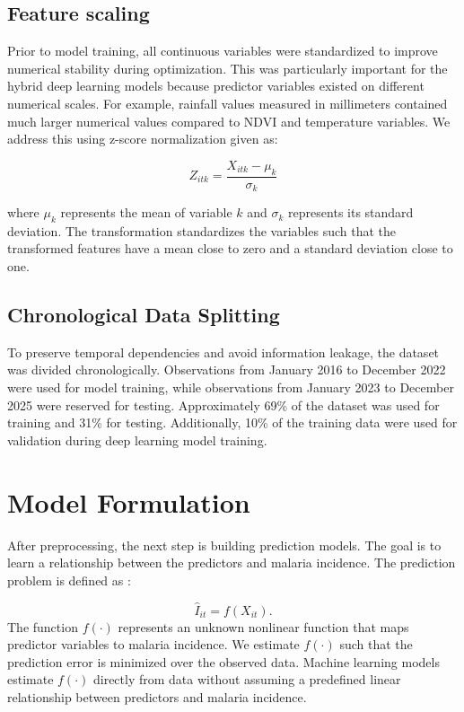     \subsection{Feature scaling}
    \label{sec:feature_scaling}
    Prior to model training, all continuous variables were standardized to improve numerical stability during optimization. This was particularly important for the hybrid deep learning models because predictor variables existed on different numerical scales. For example, rainfall values measured in millimeters contained much larger numerical values compared to NDVI and temperature variables. We address this using  z-score normalization \cite{Srivastava2025} given as:
    
    \[
    Z_{itk} = \frac{X_{itk} - \mu_k}{\sigma_k}
    \]
    
    where \(\mu_k\) represents the mean of variable \(k\) and \(\sigma_k\) represents its standard deviation. The transformation standardizes the variables such that the transformed features have a mean close to zero and a standard deviation close to one. 
    
   	\subsection{Chronological Data Splitting }
   	\label{sec:data_splitting}
   	
   	To preserve temporal dependencies and avoid information leakage, the dataset was divided chronologically. Observations from January 2016 to December 2022 were used for model training, while observations from January 2023 to December 2025 were reserved for testing. Approximately 69\% of the dataset was used for training and 31\% for testing. Additionally, 10\% of the training data were used for validation during deep learning model training.
   
	
	\section{Model Formulation}
	\label{sec:model_formulation}
	
	After preprocessing, the next step is building prediction models. The goal is to learn a relationship between the predictors and malaria incidence. The prediction problem is defined as \cite{Goodfellow-et-al-2016}:
	
	\[
	\hat{I}_{it} = f(X_{it}).
	\]
	The function \(f(\cdot)\) represents an unknown nonlinear function that maps predictor variables to malaria incidence. We estimate \(f(\cdot)\) such that the prediction error is minimized over the observed data. Machine learning models estimate \(f(\cdot)\) directly from data without assuming a predefined linear relationship between predictors and malaria incidence.
	
